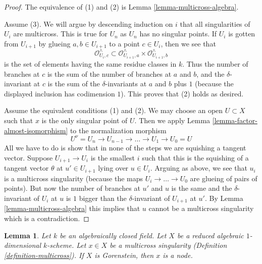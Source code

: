 \documentclass{stacks-project}
\theoremstyle{plain}
\newtheorem{lemma}[subsection]{Lemma}
\theoremstyle{definition}
\theoremstyle{remark}
\numberwithin{equation}{subsection}
\begin{document}
\begin{proof}
The equivalence of (1) and (2) is Lemma \ref{lemma-multicross-algebra}.

\medskip\noindent
Assume (3). We will argue by descending induction on $i$ that all singularities
of $U_i$ are multicross. This is true for $U_n$ as $U_n$ has no singular points.
If $U_i$ is gotten from $U_{i + 1}$ by glueing $a, b \in U_{i + 1}$
to a point $c \in U_i$, then we see that
$$
\mathcal{O}_{U_i, c}^\wedge \subset
\mathcal{O}_{U_{i + 1}, a}^\wedge \times \mathcal{O}_{U_{i + 1}, b}^\wedge
$$
is the set of elements having the same residue classes in $k$.
Thus the number of branches at $c$ is the sum of the number of
branches at $a$ and $b$, and the $\delta$-invariant at $c$
is the sum of the $\delta$-invariants at $a$ and $b$ plus $1$
(because the displayed inclusion has codimension $1$).
This proves that (2) holds as desired.

\medskip\noindent
Assume the equivalent conditions (1) and (2). We may choose an open
$U \subset X$ such that $x$ is the only singular point of $U$.
Then we apply Lemma \ref{lemma-factor-almost-isomorphism} to
the normalization morphism
$$
U^\nu = U_n \to U_{n - 1} \to \ldots \to U_1 \to U_0 = U
$$
All we have to do is show that in none of the steps we are
squishing a tangent vector. Suppose $U_{i + 1} \to U_i$ is the
smallest $i$ such that this is the squishing of a tangent
vector $\theta$ at $u' \in U_{i + 1}$ lying over $u \in U_i$.
Arguing as above, we see that $u_i$ is a multicross singularity
(because the maps $U_i \to \ldots \to U_0$ are glueing of
pairs of points). But now the number of branches at $u'$ and $u$
is the same and the $\delta$-invariant of $U_i$ at $u$
is $1$ bigger than the $\delta$-invariant of $U_{i + 1}$ at $u'$.
By Lemma \ref{lemma-multicross-algebra}
this implies that $u$ cannot be a multicross singularity which
is a contradiction.
\end{proof}

\begin{lemma}
\label{lemma-multicross-gorenstein-is-nodal}
Let $k$ be an algebraically closed field. Let $X$ be a reduced algebraic
$1$-dimensional $k$-scheme. Let $x \in X$ be a multicross singularity
(Definition \ref{definition-multicross}).
If $X$ is Gorenstein, then $x$ is a node.
\end{lemma}
\end{document}

